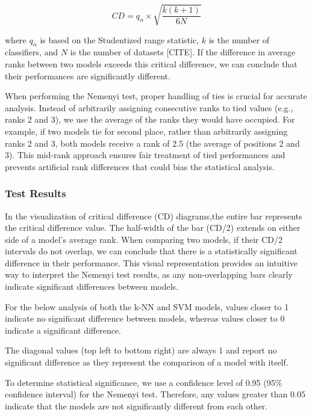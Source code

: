 \begin{equation}
    CD = q_{\alpha} \times \sqrt{\frac{k(k+1)}{6N}}
\end{equation}

where $q_{\alpha}$ is based on the Studentized range statistic, $k$ is the number of classifiers, and $N$ is the number of datasets [CITE].
If the difference in average ranks between two models exceeds this critical difference, we can conclude that their performances are significantly different.

When performing the Nemenyi test, proper handling of ties is crucial for accurate analysis.
Instead of arbitrarily assigning consecutive ranks to tied values (e.g., ranks 2 and 3), we use the
average of the ranks they would have occupied. For example, if two models tie for second place,
rather than arbitrarily assigning ranks 2 and 3, both models receive a rank of 2.5 (the average of positions 2 and 3).
This mid-rank approach ensures fair treatment of tied performances and prevents artificial rank differences that could bias the statistical analysis.

\subsubsection{Test Results}
In the visualization of critical difference (CD) diagrams,the entire bar represents the critical difference value.
The half-width of the bar (CD/2) extends on either side of a model's average rank. When comparing two models,
if their CD/2 intervals do not overlap, we can conclude that there is a statistically significant difference in their performance.
This visual representation provides an intuitive way to interpret the Nemenyi test results, as any
non-overlapping bars clearly indicate significant differences between models.

For the below analysis of both the k-NN and SVM models, values closer to 1 indicate no significant difference between models,
whereas values closer to 0 indicate a significant difference.

The diagonal values (top left to bottom right) are always 1 and report no significant difference
as they represent the comparison of a model with itself.

To determine statistical significance, we use a confidence level of 0.95 (95\% confidence interval) for the Nemenyi test.
Therefore, any values greater than 0.05 indicate that the models are not significantly different from each other.

